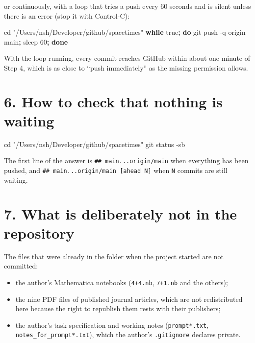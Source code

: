 \documentclass[
  10pt,
]{article}
\newenvironment{Shaded}{}{}
\newcommand{\AttributeTok}[1]{\textcolor[rgb]{0.49,0.56,0.16}{#1}}
\newcommand{\BuiltInTok}[1]{\textcolor[rgb]{0.00,0.50,0.00}{#1}}
\newcommand{\ControlFlowTok}[1]{\textcolor[rgb]{0.00,0.44,0.13}{\textbf{#1}}}
\newcommand{\FunctionTok}[1]{\textcolor[rgb]{0.02,0.16,0.49}{#1}}
\newcommand{\KeywordTok}[1]{\textcolor[rgb]{0.00,0.44,0.13}{\textbf{#1}}}
\newcommand{\NormalTok}[1]{#1}
\newcommand{\StringTok}[1]{\textcolor[rgb]{0.25,0.44,0.63}{#1}}
\providecommand{\tightlist}{%
  \setlength{\itemsep}{0pt}\setlength{\parskip}{0pt}}
\begin{document}
or continuously, with a loop that tries a push every 60 seconds and is
silent unless there is an error (stop it with Control-C):

\begin{Shaded}
\begin{Highlighting}[]
\BuiltInTok{cd} \StringTok{"/Users/nsh/Developer/github/spacetimes"}
\ControlFlowTok{while} \FunctionTok{true}\KeywordTok{;} \ControlFlowTok{do} \FunctionTok{git}\NormalTok{ push }\AttributeTok{{-}q}\NormalTok{ origin main}\KeywordTok{;} \FunctionTok{sleep}\NormalTok{ 60}\KeywordTok{;} \ControlFlowTok{done}
\end{Highlighting}
\end{Shaded}

With the loop running, every commit reaches GitHub within about one
minute of Step 4, which is as close to ``push immediately'' as the
missing permission allows.

\hypertarget{how-to-check-that-nothing-is-waiting}{%
\section{6. How to check that nothing is
waiting}\label{how-to-check-that-nothing-is-waiting}}

\begin{Shaded}
\begin{Highlighting}[]
\BuiltInTok{cd} \StringTok{"/Users/nsh/Developer/github/spacetimes"}
\FunctionTok{git}\NormalTok{ status }\AttributeTok{{-}sb}
\end{Highlighting}
\end{Shaded}

The first line of the answer is \texttt{\#\#\ main...origin/main} when
everything has been pushed, and
\texttt{\#\#\ main...origin/main\ {[}ahead\ N{]}} when \texttt{N}
commits are still waiting.

\hypertarget{what-is-deliberately-not-in-the-repository}{%
\section{7. What is deliberately not in the
repository}\label{what-is-deliberately-not-in-the-repository}}

The files that were already in the folder when the project started are
not committed:

\begin{itemize}
\tightlist
\item
  the author's Mathematica notebooks (\texttt{4+4.nb}, \texttt{7+1.nb}
  and the others);
\item
  the nine PDF files of published journal articles, which are not
  redistributed here because the right to republish them rests with
  their publishers;
\item
  the author's task specification and working notes
  (\texttt{prompt*.txt}, \texttt{notes\_for\_prompt*.txt}), which the
  author's \texttt{.gitignore} declares private.
\end{itemize}
\end{document}
